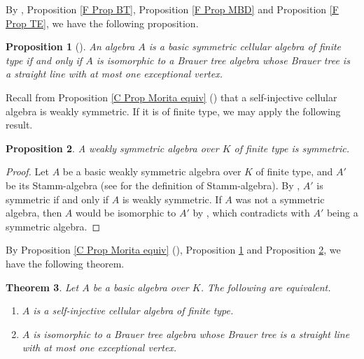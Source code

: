 \documentclass[12pt]{amsart}
\newtheorem{thm}{Theorem}[section]
\newtheorem{prop}[thm]{Proposition}
\numberwithin{equation}{thm}
\newcounter{ni}
\newcommand{\roii}{\roman{ni}}
\newcounter{san}
\newcommand{\roiii}{\roman{san}}
\begin{document}

By \cite[Theorem 3.11]{S}, Proposition \ref{F Prop BT}, Proposition \ref{F Prop MBD} and Proposition \ref{F Prop TE}, 
we have the following proposition. 


\begin{prop}[{\cite{O}}] 
\label{F Prop symmetric}
An algebra $A$ is a basic symmetric cellular algebra of finite type 
if and only if 
$A$ is isomorphic  to a Brauer tree algebra
whose Brauer tree is a straight line with at most one exceptional vertex. 
\end{prop} 


Recall from Proposition \ref{C Prop Morita equiv} (\roii) that
a self-injective cellular algebra is weakly symmetric. 
If it is of finite type, we may apply the following result.


\begin{prop} 
\label{F Prop weak}
A weakly symmetric algebra over $K$ of finite type is symmetric. 
\end{prop}

\begin{proof}
Let $A$ be a basic weakly symmetric algebra over $K$ of finite type, 
and $A'$ be its Stamm-algebra (see \cite[Definition 4.4]{W} for the definition of Stamm-algebra). 
By \cite[Coroollary 4.7 (\roiii) in Part I]{W}, $A'$ is symmetric if and only if $A$ is weakly symmetric. 
If $A$ was not a symmetric algebra, then 
$A$ would be isomorphic to $A'$ by \cite[Theorem C]{KS}, 
which contradicts with $A'$ being a symmetric algebra.
\end{proof}


By Proposition \ref{C Prop Morita equiv} (\roii), 
Proposition \ref{F Prop symmetric}
and 
Proposition \ref{F Prop weak}, 
we have the following theorem. 


\begin{thm}\label{F Theorem}
Let $A$ be a basic algebra over $K$. 
The following are equivalent. 
\begin{enumerate} 
\item 
$A$ is a self-injective cellular algebra of finite type. 

\item 
$A$ is isomorphic  to a Brauer tree algebra 
whose Brauer tree is
a straight line with at most one exceptional vertex. 
\end{enumerate}
\end{thm}
\end{document}
